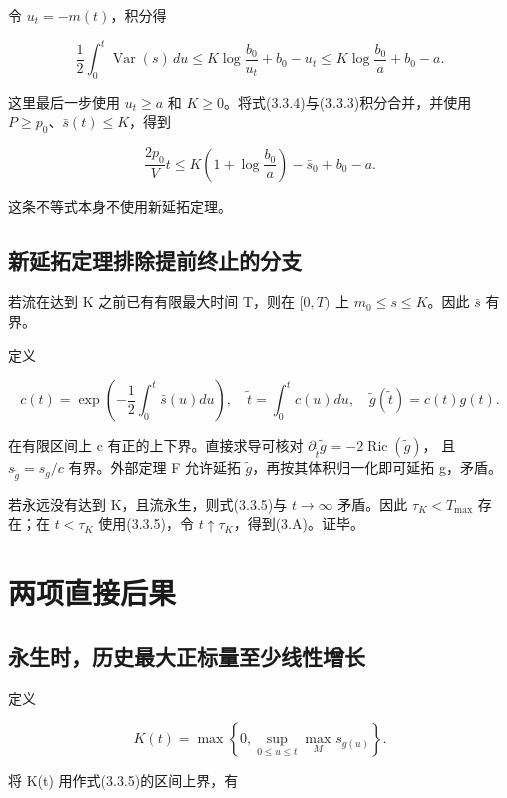 \documentclass[UTF8,11pt,openany,fontset=none]{ctexbook}
\theoremstyle{definition}
\theoremstyle{remark}
\begin{document}
令 \(u_t=-m(t)\)，积分得

\[
 \frac12\int_0^t\operatorname{Var}(s)\,du
 \le K\log\frac{b_0}{u_t}+b_0-u_t
 \le K\log\frac{b_0}{a}+b_0-a.
\tag{3.3.4}
\]

这里最后一步使用 \(u_t\ge a\) 和 \(K\ge0\)。将式(3.3.4)与(3.3.3)积分合并，并使用 \(P\ge p_0\)、\(\bar s(t)\le K\)，得到

\[
 \boxed{
 \frac{2p_0}{V}t
 \le K\left(1+\log\frac{b_0}{a}\right)-\bar s_0+b_0-a.
 }
\tag{3.3.5}
\]

这条不等式本身不使用新延拓定理。

\subsection{新延拓定理排除提前终止的分支}\label{v3-ux65b0ux5ef6ux62d3ux5b9aux7406ux6392ux9664ux63d0ux524dux7ec8ux6b62ux7684ux5206ux652f}

若流在达到 K 之前已有有限最大时间 T，则在 \([0,T)\) 上 \(m_0\le s\le K\)。因此 \(\bar s\) 有界。

定义

\[
 c(t)=\exp\left(-\frac12\int_0^t\bar s(u)du\right),
 \quad \widetilde t=\int_0^t c(u)du,
 \quad \widetilde g(\widetilde t)=c(t)g(t).
\]

在有限区间上 c 有正的上下界。直接求导可核对 \(\partial_{\widetilde t}\widetilde g=-2\operatorname{Ric}(\widetilde g)\)， 且 \(s_{\widetilde g}=s_g/c\) 有界。外部定理 F 允许延拓 \(\widetilde g\)，再按其体积归一化即可延拓 g，矛盾。

若永远没有达到 K，且流永生，则式(3.3.5)与 \(t\to\infty\) 矛盾。因此 \(\tau_K<T_{\max}\) 存在；在 \(t<\tau_K\) 使用(3.3.5)，令 \(t\uparrow\tau_K\)，得到(3.A)。证毕。

\section{两项直接后果}\label{v3-ux4e24ux9879ux76f4ux63a5ux540eux679c}

\subsection{永生时，历史最大正标量至少线性增长}\label{v3-ux6c38ux751fux65f6ux5386ux53f2ux6700ux5927ux6b63ux6807ux91cfux81f3ux5c11ux7ebfux6027ux589eux957f}

定义

\[
 K(t)=\max\left\{0,\sup_{0\le u\le t}\max_Ms_{g(u)}\right\}.
\]

将 K(t) 用作式(3.3.5)的区间上界，有
\end{document}
